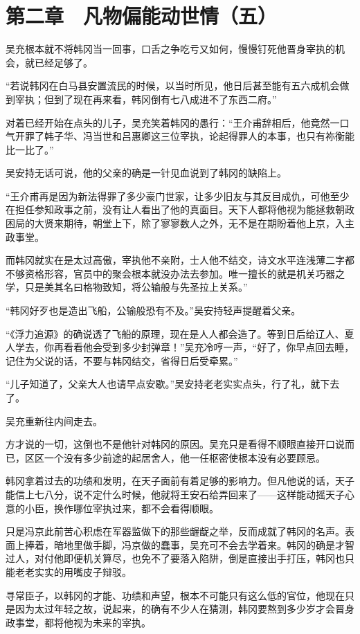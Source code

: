 \section{第二章　凡物偏能动世情（五）}

吴充根本就不将韩冈当一回事，口舌之争吃亏又如何，慢慢钉死他晋身宰执的机会，就已经足够了。

“若说韩冈在白马县安置流民的时候，以当时所见，他日后甚至能有五六成机会做到宰执；但到了现在再来看，韩冈倒有七八成进不了东西二府。”

对着已经开始在点头的儿子，吴充笑着韩冈的愚行：“王介甫辞相后，他竟然一口气开罪了韩子华、冯当世和吕惠卿这三位宰执，论起得罪人的本事，也只有祢衡能比一比了。”

吴安持无话可说，他的父亲的确是一针见血说到了韩冈的缺陷上。

“王介甫再是因为新法得罪了多少豪门世家，让多少旧友与其反目成仇，可他至少在担任参知政事之前，没有让人看出了他的真面目。天下人都将他视为能拯救朝政困局的大贤来期待，朝堂上下，除了寥寥数人之外，无不是在期盼着他上京，入主政事堂。

而韩冈就实在是太过高傲，宰执他不亲附，士人他不结交，诗文水平连浅薄二字都不够资格形容，官员中的聚会根本就没办法去参加。唯一擅长的就是机关巧器之学，只是美其名曰格物致知，将公输般与先圣拉上关系。”

“韩冈好歹也是造出飞船，公输般恐有不及。”吴安持轻声提醒着父亲。

“《浮力追源》的确说透了飞船的原理，现在是人人都会造了。等到日后给辽人、夏人学去，你再看看他会受到多少封弹章！”吴充冷哼一声，“好了，你早点回去睡，记住为父说的话，不要与韩冈结交，省得日后受牵累。”

“儿子知道了，父亲大人也请早点安歇。”吴安持老老实实点头，行了礼，就下去了。

吴充重新往内间走去。

方才说的一切，这倒也不是他针对韩冈的原因。吴充只是看得不顺眼直接开口说而已，区区一个没有多少前途的起居舍人，他一任枢密使根本没有必要顾忌。

韩冈拿着过去的功绩和发明，在天子面前有着足够的影响力。但凡他说的话，天子能信上七八分，说不定什么时候，他就将王安石给弄回来了——这样能动摇天子心意的小臣，换作哪位宰执过来，都不会看得顺眼。

只是冯京此前苦心积虑在军器监做下的那些龌龊之举，反而成就了韩冈的名声。表面上捧着，暗地里做手脚，冯京做的蠢事，吴充可不会去学着来。韩冈的确是才智过人，对付他即便机关算尽，也免不了要落入陷阱，倒是直接出手打压，韩冈也只能老老实实的用嘴皮子辩驳。

寻常臣子，以韩冈的才能、功绩和声望，根本不可能只有这么低的官位，他现在只是因为太过年轻之故，说起来，的确有不少人在猜测，韩冈要熬到多少岁才会晋身政事堂，都将他视为未来的宰执。

